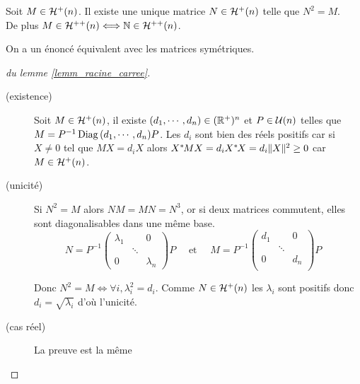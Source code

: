 \begin{lemm}
\label{lemm_racine_carree}

Soit $M\in\mathcal{H}^{+}(n)$. Il existe une unique matrice $N\in\mathcal{H}^{+}(n)$ telle que
$N^2=M$.\\ De plus $M\in\mathcal{H}^{++}(n) \Longleftrightarrow \mathbb{N}\in\mathcal{H}^{++}(n)$.

On a un énoncé équivalent avec les matrices symétriques.
\end{lemm}

\begin{proof}[du lemme \ref{lemm_racine_carree}]\ 

\begin{description}
 \item [(existence)]
Soit $M\in\mathcal{H}^{+}(n)$, il existe $(d_1,\cdots,d_n)\in(\mathbb{R}^+)^n$ et $P\in\mathcal{U}(n)$
telles que $M=P^{-1}\operatorname{Diag\,}(d_1,\cdots,d_n)P$. Les $d_i$ sont bien des réels
positifs car si $X\neq 0$ tel que $MX=d_iX$ alors $X^{*}\hspace{-0.1em}MX=d_iX^{*}\hspace{-0.1em}X=d_i|\negthinspace\hspace{0.07em}|X|\negthinspace\hspace{0.07em}|^2\geq
0$ car $M\in\mathcal{H}^{+}(n)$.

\item [(unicité)]
Si $N^2=M$ alors $NM=MN=N^3$, or si deux matrices commutent, elles sont
diagonalisables dans une même base.
\begin{displaymath}
 N = P^{-1}\begin{pmatrix}
    \lambda_1 & & 0 \\  &\ddots& \\  0 & & \lambda_n
           \end{pmatrix} P \quad \text{ et } \quad 
 M = P^{-1}\begin{pmatrix}
    d_1 & & 0 \\  &\ddots& \\  0 & & d_n\\
           \end{pmatrix} P \quad 
\end{displaymath}

Donc $N^2=M\Longleftrightarrow \forall i,\lambda_i^2=d_i$. Comme $N\in\mathcal{H}^{+}(n)$
les $\lambda_i$ sont positifs donc $d_i = \sqrt{\lambda_i}$ d'où l'unicité.

\item [(cas réel)] La preuve est la même
\end{description}
\end{proof}


